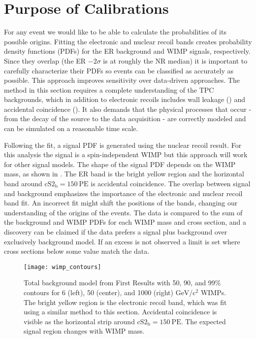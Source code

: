 \section{Purpose of Calibrations}
\label{sec:er_nr_calibrations_purpose}
For any event we would like to be able to calculate the probabilities of its possible origins.  Fitting the electronic and nuclear
recoil bands creates probability density functions (PDFs) for the ER background and WIMP signals, respectively.  Since they overlap
(the ER $-2\sigma$ is at roughly the NR median) it is important to carefully characterize their PDFs so events can be classified
as accurately as possible.  This approach improves sensitivity over
data-driven approaches.  The method in this section requires a complete understanding of the TPC
backgrounds, which
in addition to electronic recoils includes wall leakage () and accidental
coincidence ().  It also demands that
the physical processes that occur - from the decay of the source to the data acquisition - are correctly modeled and can be
simulated on a reasonable time scale.

Following the fit, a signal PDF is generated using the nuclear recoil result.  For this analysis the signal is a spin-independent WIMP but
this approach will work for other signal models.  The shape of the signal PDF depends on the WIMP mass, as shown in
.  The ER band is the bright yellow region and the horizontal band around
$\mathrm{cS2_b} = 150\ \mathrm{PE}$ is
accidental coincidence.  The overlap between signal and background emphasizes the importance of the electronic and nuclear recoil band
fit.  An incorrect fit might shift the positions of the bands, changing our understanding of the origins of the events.  The data is
compared to the sum of the background and WIMP PDFs for each WIMP mass and cross section, and a discovery can be claimed if the data
prefers a signal plus background over exclusively background model.  If an excess is not observed a limit is set where
cross sections below some value match the data.

\begin{figure}
\centering
\texttt{[image: wimp\_contours]}
\caption{Total background model from First Results with 50, 90, and 99\% contours for 6 (left), 50 (center), and 1000 (right)
$\mathrm{GeV/c^2}$ WIMPs.  The bright yellow region is the
electronic recoil band, which was fit using a similar method to this section.  Accidental coincidence is visible as the horizontal strip
around $\mathrm{cS2_b} = 150\ \mathrm{PE}$.  The expected signal region changes with WIMP mass.}
\label{fig:er_nr_calibrations_purpose_wimp_contours}
\end{figure}



